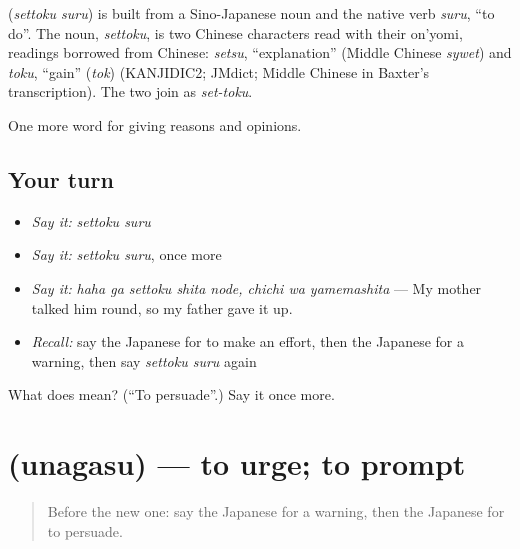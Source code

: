 \begin{cousinweb}
\textbf{} (\emph{settoku suru}) is built from a Sino-Japanese noun and the native verb \emph{suru}, \textquotedblleft{}to do\textquotedblright{}. The noun, \emph{settoku}, is two Chinese characters read with their on'yomi, readings borrowed from Chinese: \emph{setsu}, \textquotedblleft{}explanation\textquotedblright{} (Middle Chinese \emph{sywet}) and \emph{toku}, \textquotedblleft{}gain\textquotedblright{} (\emph{tok}) (KANJIDIC2; JMdict; Middle Chinese in Baxter's transcription). The two join as \emph{set-toku}.
\end{cousinweb}

\begin{grammarlens}[title={What you've built}]
One more word for giving reasons and opinions.
\end{grammarlens}

\subsection*{Your turn}
\begin{itemize}
\raggedright
  \item \emph{Say it:} \emph{settoku suru}
  \item \emph{Say it:} \emph{settoku suru}, once more
  \item \emph{Say it:} \emph{haha ga settoku shita node, chichi wa yamemashita} — My mother talked him round, so my father gave it up.
  \item \emph{Recall:} say the Japanese for to make an effort, then the Japanese for a warning, then say \emph{settoku suru} again
\end{itemize}

\begin{tcolorbox}[breakable,colback=teal!4,colframe=teal!35!black,title={Before you move on}]
What does  mean? (\textquotedblleft{}To persuade\textquotedblright{}.) Say it once more.
\end{tcolorbox}
\section[\texorpdfstring{\ja{うながす} (unagasu)}{うながす (unagasu)}]{ (unagasu) — to urge; to prompt}

\label{lesson:JA-C341-unagasu}



\begin{quote}
Before the new one: say the Japanese for a warning, then the Japanese for to persuade.
\end{quote}

